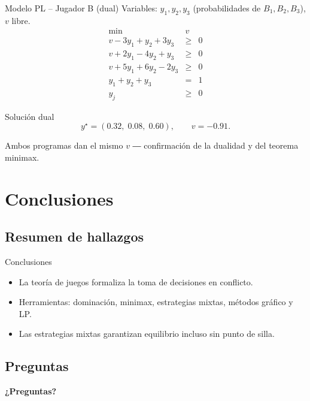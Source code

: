 \documentclass{beamer}
\begin{document}
\begin{frame}{Modelo PL – Jugador B (dual)}
\small
Variables: \(y_1,y_2,y_3\) (probabilidades de \(B_1,B_2,B_3\)), \(v\) libre.
\[
\renewcommand{\arraystretch}{1.15}
\begin{array}{rcl}
\min & v & \\ \hline
v - 3y_1 +  y_2 + 3y_3 &\ge& 0\\
v + 2y_1 - 4y_2 +  y_3 &\ge& 0\\
v + 5y_1 + 6y_2 - 2y_3 &\ge& 0\\
y_1 + y_2 + y_3 &=& 1\\
y_j &\ge& 0
\end{array}
\]
\begin{block}{Solución dual}
\[
y^\star=(0.32,\;0.08,\;0.60),\qquad v=-0.91.
\]
\end{block}

\begin{center}\scriptsize
Ambos programas dan el mismo \(v\) ― confirmación de la dualidad y del teorema minimax.
\end{center}
\end{frame}


\section{Conclusiones}

\subsection{Resumen de hallazgos}
\begin{frame}{Conclusiones}
\begin{itemize}[<+->]
  \item La teoría de juegos formaliza la toma de decisiones en conflicto.
  \item Herramientas: dominación, minimax, estrategias mixtas, métodos gráfico y LP.
  \item Las estrategias mixtas garantizan equilibrio incluso sin punto de silla.
\end{itemize}
\end{frame}

\subsection{Preguntas}
\begin{frame}[plain,c]
\centering
\Huge\textbf{¿Preguntas?}
\end{frame}
\end{document}
